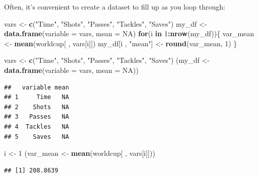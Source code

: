 \documentclass[]{book}
\makeatletter
\newenvironment{Shaded}{\begin{snugshade}}{\end{snugshade}}
\newcommand{\KeywordTok}[1]{\textcolor[rgb]{0.13,0.29,0.53}{\textbf{#1}}}
\newcommand{\DataTypeTok}[1]{\textcolor[rgb]{0.13,0.29,0.53}{#1}}
\newcommand{\DecValTok}[1]{\textcolor[rgb]{0.00,0.00,0.81}{#1}}
\newcommand{\StringTok}[1]{\textcolor[rgb]{0.31,0.60,0.02}{#1}}
\newcommand{\OtherTok}[1]{\textcolor[rgb]{0.56,0.35,0.01}{#1}}
\newcommand{\ControlFlowTok}[1]{\textcolor[rgb]{0.13,0.29,0.53}{\textbf{#1}}}
\newcommand{\OperatorTok}[1]{\textcolor[rgb]{0.81,0.36,0.00}{\textbf{#1}}}
\newcommand{\NormalTok}[1]{#1}
\newenvironment{kframe}{%
\medskip{}
\setlength{\fboxsep}{.8em}
 \def\at@end@of@kframe{}%
 \ifinner\ifhmode%
  \def\at@end@of@kframe{\end{minipage}}%
  \begin{minipage}{\columnwidth}%
 \fi\fi%
 \def\FrameCommand##1{\hskip\@totalleftmargin \hskip-\fboxsep
 \colorbox{shadecolor}{##1}\hskip-\fboxsep
     \hskip-\linewidth \hskip-\@totalleftmargin \hskip\columnwidth}%
 \MakeFramed {\advance\hsize-\width
   \@totalleftmargin\z@ \linewidth\hsize
   \@setminipage}}%
 {\par\unskip\endMakeFramed%
 \at@end@of@kframe}
\renewenvironment{Shaded}{\begin{kframe}}{\end{kframe}}
\theoremstyle{definition}
\theoremstyle{definition}
\theoremstyle{definition}
\theoremstyle{remark}
\makeatother
\begin{document}
Often, it's convenient to create a dataset to fill up as you loop
through:

\begin{Shaded}
\begin{Highlighting}[]
\NormalTok{vars <-}\StringTok{ }\KeywordTok{c}\NormalTok{(}\StringTok{"Time"}\NormalTok{, }\StringTok{"Shots"}\NormalTok{, }\StringTok{"Passes"}\NormalTok{, }\StringTok{"Tackles"}\NormalTok{, }\StringTok{"Saves"}\NormalTok{)}
\NormalTok{my_df <-}\StringTok{ }\KeywordTok{data.frame}\NormalTok{(}\DataTypeTok{variable =}\NormalTok{ vars, }\DataTypeTok{mean =} \OtherTok{NA}\NormalTok{)}
\ControlFlowTok{for}\NormalTok{(i }\ControlFlowTok{in} \DecValTok{1}\OperatorTok{:}\KeywordTok{nrow}\NormalTok{(my_df))\{}
\NormalTok{        var_mean <-}\StringTok{ }\KeywordTok{mean}\NormalTok{(worldcup[ , vars[i]])}
\NormalTok{        my_df[i , }\StringTok{"mean"}\NormalTok{] <-}\StringTok{ }\KeywordTok{round}\NormalTok{(var_mean, }\DecValTok{1}\NormalTok{)}
\NormalTok{\}}
\end{Highlighting}
\end{Shaded}

\begin{Shaded}
\begin{Highlighting}[]
\NormalTok{vars <-}\StringTok{ }\KeywordTok{c}\NormalTok{(}\StringTok{"Time"}\NormalTok{, }\StringTok{"Shots"}\NormalTok{, }\StringTok{"Passes"}\NormalTok{, }\StringTok{"Tackles"}\NormalTok{, }\StringTok{"Saves"}\NormalTok{)}
\NormalTok{(my_df <-}\StringTok{ }\KeywordTok{data.frame}\NormalTok{(}\DataTypeTok{variable =}\NormalTok{ vars, }\DataTypeTok{mean =} \OtherTok{NA}\NormalTok{))}
\end{Highlighting}
\end{Shaded}

\begin{verbatim}
##   variable mean
## 1     Time   NA
## 2    Shots   NA
## 3   Passes   NA
## 4  Tackles   NA
## 5    Saves   NA
\end{verbatim}

\begin{Shaded}
\begin{Highlighting}[]
\NormalTok{i <-}\StringTok{ }\DecValTok{1}
\NormalTok{(var_mean <-}\StringTok{ }\KeywordTok{mean}\NormalTok{(worldcup[ , vars[i]]))}
\end{Highlighting}
\end{Shaded}

\begin{verbatim}
## [1] 208.8639
\end{verbatim}
\end{document}

